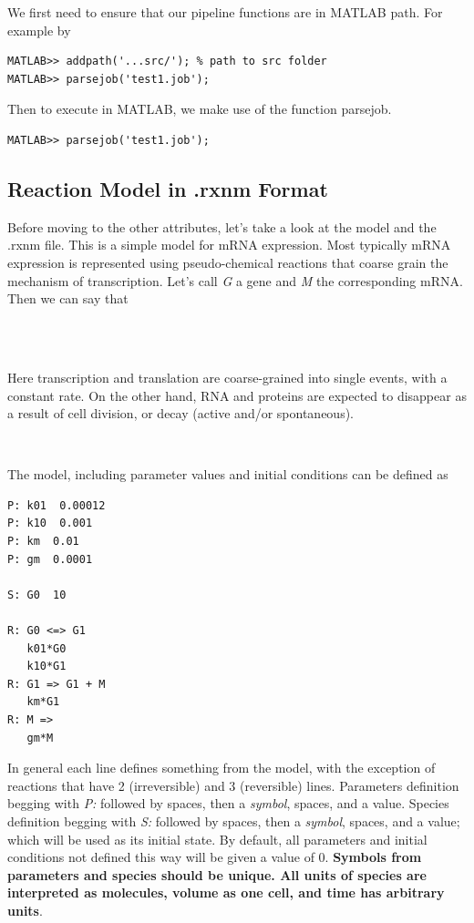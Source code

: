 \documentclass[letterpaper]{article}
\begin{document}
We first need to ensure that our pipeline functions are
in MATLAB path. For example by
{\footnotesize
\begin{verbatim}
MATLAB>> addpath('...src/'); % path to src folder
MATLAB>> parsejob('test1.job');
\end{verbatim}
}
Then to execute in MATLAB, we make use of the function
\textsf{parsejob}.
{\footnotesize
\begin{verbatim}
MATLAB>> parsejob('test1.job');
\end{verbatim}
}

\subsection{Reaction Model in .rxnm Format}

Before moving to the other attributes, let's take a look at the
model and the \textsf{.rxnm} file. This is a simple model for mRNA
expression. Most typically mRNA expression is represented using
pseudo-chemical reactions that coarse grain the mechanism of
transcription. Let's call \emph{G} a gene and \emph{M} the
corresponding mRNA. Then we can say that
\begin{center}
   \\
   \\
\end{center}
Here transcription and translation are coarse-grained into single
events, with a constant rate. On the other hand, RNA and proteins are
expected to disappear as a result of cell division, or decay (active
and/or spontaneous).
\begin{center}
   \\
\end{center}
The model, including parameter values and initial conditions can be
defined as
{\footnotesize
\begin{verbatim}
P: k01  0.00012
P: k10  0.001
P: km  0.01
P: gm  0.0001

S: G0  10

R: G0 <=> G1
   k01*G0
   k10*G1
R: G1 => G1 + M
   km*G1
R: M =>
   gm*M
\end{verbatim}
}

In general each line defines something from the model, with the
exception of reactions that have 2 (irreversible) and 3 (reversible)
lines. Parameters definition begging with \emph{P:} followed by spaces,
then a \emph{symbol}, spaces, and a value. Species definition
begging with \emph{S:} followed by spaces, then a \emph{symbol},
spaces, and a value; which will be used as its initial state. By
default, all parameters and initial conditions not defined this way
will be given a value of 0.
{\bf Symbols from parameters and species should be unique. All units
  of species are interpreted as molecules, volume as one cell, and
  time has arbitrary units}.
\end{document}
